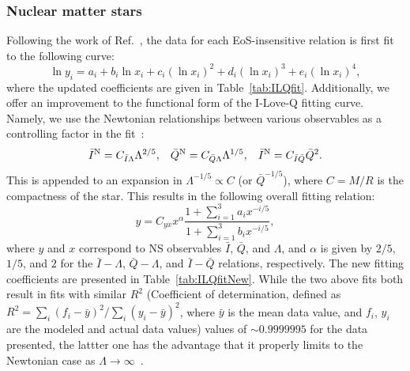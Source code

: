 \documentclass[prd,twocolumn,nofootinbib,superscriptaddress,amsmath,amssymb]{revtex4-1}
\begin{document}
\subsubsection{Nuclear matter stars}\label{sec:ilq-nuc}
Following the work of Ref.~\cite{Yagi:ILQ}, the data for each EoS-insensitive relation is first fit to the following curve:
\begin{equation}\label{eq:ILQfit}
\ln{y_i}=a_i+b_i \ln{x_i} + c_i (\ln{x_i})^2 + d_i (\ln{x_i})^3 + e_i (\ln{x_i})^4,
\end{equation}
where the updated coefficients are given in Table~\ref{tab:ILQfit}.
Additionally, we offer an improvement to the functional form of the I-Love-Q fitting curve. 
Namely, we use the Newtonian relationships between various observables as a controlling factor in the fit~\cite{Yagi:ILQ}:
\begin{equation}\label{eq:Newtonian}
\bar{I}^{\text{N}} = C_{\bar{I}\Lambda}\Lambda^{2/5}, \hspace{3mm} \bar{Q}^{\text{N}} = C_{\bar{Q}\Lambda}\Lambda^{1/5}, \hspace{3mm} \bar{I}^{\text{N}} = C_{\bar{I}\bar{Q}}\bar{Q}^{2}.
\end{equation}
This is appended to an expansion in $\Lambda^{-1/5} \propto C$ (or $\bar{Q}^{-1/5}$), where $C=M/R$ is the compactness of the star.
This results in the following overall fitting relation:
\begin{equation}\label{eq:ILQfitNew}
y=C_{yx} x^{\alpha} \frac{1+\sum_{i=1}^3 a_i x^{-i/5}}{1+\sum_{i=1}^3 b_i x^{-i/5}},
\end{equation}
where $y$ and $x$ correspond to NS observables $\bar{I}$, $\bar{Q}$, and $\Lambda$, and $\alpha$ is given by $2/5$, $1/5$, and $2$ for the $\bar{I}-\Lambda$, $\bar{Q}-\Lambda$, and $\bar{I}-\bar{Q}$ relations, respectively.
The new fitting coefficients are presented in Table~\ref{tab:ILQfitNew}.
While the two above fits both result in fits with similar $R^2$ (Coefficient of determination, defined as $R^2=\sum_i(f_i-\bar{y})^2/\sum_i(y_i-\bar{y})^2$, where $\bar{y}$ is the mean data value, and $f_i$, $y_i$ are the modeled and actual data values) values of $\sim 0.9999995$ for the data presented, the lattter one has the advantage that it properly limits to the Newtonian case as $\Lambda \rightarrow \infty$~\cite{Yagi:binLove}.
\end{document}
